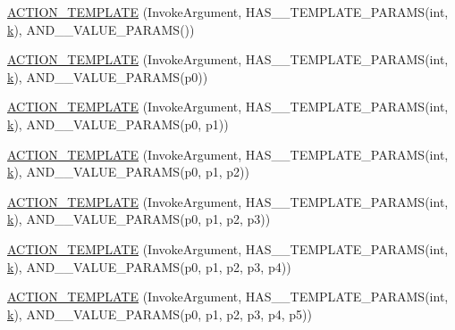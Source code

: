 \begin{DoxyCompactItemize}
\item 
\hyperlink{namespacetesting_a8a02397c7fdf8e84d559ab72dcc28eb1}{A\+C\+T\+I\+O\+N\+\_\+\+T\+E\+M\+P\+L\+A\+TE} (Invoke\+Argument, H\+A\+S\+\_\+\_\+\+T\+E\+M\+P\+L\+A\+T\+E\+\_\+\+P\+A\+R\+A\+MS(int, \hyperlink{jquery_8js_ab26645c014aa005ecedef329ecf58c99}{k}), A\+N\+D\+\_\+\_\+\+V\+A\+L\+U\+E\+\_\+\+P\+A\+R\+A\+MS())
\item 
\hyperlink{namespacetesting_afaa0d88f5442f9aee5d6147377d3e50c}{A\+C\+T\+I\+O\+N\+\_\+\+T\+E\+M\+P\+L\+A\+TE} (Invoke\+Argument, H\+A\+S\+\_\+\_\+\+T\+E\+M\+P\+L\+A\+T\+E\+\_\+\+P\+A\+R\+A\+MS(int, \hyperlink{jquery_8js_ab26645c014aa005ecedef329ecf58c99}{k}), A\+N\+D\+\_\+\_\+\+V\+A\+L\+U\+E\+\_\+\+P\+A\+R\+A\+MS(p0))
\item 
\hyperlink{namespacetesting_a39bf6c49dc1323cc9539a12249e60aba}{A\+C\+T\+I\+O\+N\+\_\+\+T\+E\+M\+P\+L\+A\+TE} (Invoke\+Argument, H\+A\+S\+\_\+\_\+\+T\+E\+M\+P\+L\+A\+T\+E\+\_\+\+P\+A\+R\+A\+MS(int, \hyperlink{jquery_8js_ab26645c014aa005ecedef329ecf58c99}{k}), A\+N\+D\+\_\+\_\+\+V\+A\+L\+U\+E\+\_\+\+P\+A\+R\+A\+MS(p0, p1))
\item 
\hyperlink{namespacetesting_ac50647216fdf5197899a3d5034a9a670}{A\+C\+T\+I\+O\+N\+\_\+\+T\+E\+M\+P\+L\+A\+TE} (Invoke\+Argument, H\+A\+S\+\_\+\_\+\+T\+E\+M\+P\+L\+A\+T\+E\+\_\+\+P\+A\+R\+A\+MS(int, \hyperlink{jquery_8js_ab26645c014aa005ecedef329ecf58c99}{k}), A\+N\+D\+\_\+\_\+\+V\+A\+L\+U\+E\+\_\+\+P\+A\+R\+A\+MS(p0, p1, p2))
\item 
\hyperlink{namespacetesting_ae98e43eecf8f44990b39b460f00b397b}{A\+C\+T\+I\+O\+N\+\_\+\+T\+E\+M\+P\+L\+A\+TE} (Invoke\+Argument, H\+A\+S\+\_\+\_\+\+T\+E\+M\+P\+L\+A\+T\+E\+\_\+\+P\+A\+R\+A\+MS(int, \hyperlink{jquery_8js_ab26645c014aa005ecedef329ecf58c99}{k}), A\+N\+D\+\_\+\_\+\+V\+A\+L\+U\+E\+\_\+\+P\+A\+R\+A\+MS(p0, p1, p2, p3))
\item 
\hyperlink{namespacetesting_a505f6d82df233802c5f4235d77dca164}{A\+C\+T\+I\+O\+N\+\_\+\+T\+E\+M\+P\+L\+A\+TE} (Invoke\+Argument, H\+A\+S\+\_\+\_\+\+T\+E\+M\+P\+L\+A\+T\+E\+\_\+\+P\+A\+R\+A\+MS(int, \hyperlink{jquery_8js_ab26645c014aa005ecedef329ecf58c99}{k}), A\+N\+D\+\_\+\_\+\+V\+A\+L\+U\+E\+\_\+\+P\+A\+R\+A\+MS(p0, p1, p2, p3, p4))
\item 
\hyperlink{namespacetesting_ab85e5f54a209bf141fc04f8612fbe887}{A\+C\+T\+I\+O\+N\+\_\+\+T\+E\+M\+P\+L\+A\+TE} (Invoke\+Argument, H\+A\+S\+\_\+\_\+\+T\+E\+M\+P\+L\+A\+T\+E\+\_\+\+P\+A\+R\+A\+MS(int, \hyperlink{jquery_8js_ab26645c014aa005ecedef329ecf58c99}{k}), A\+N\+D\+\_\+\_\+\+V\+A\+L\+U\+E\+\_\+\+P\+A\+R\+A\+MS(p0, p1, p2, p3, p4, p5))

\end{DoxyCompactItemize}
